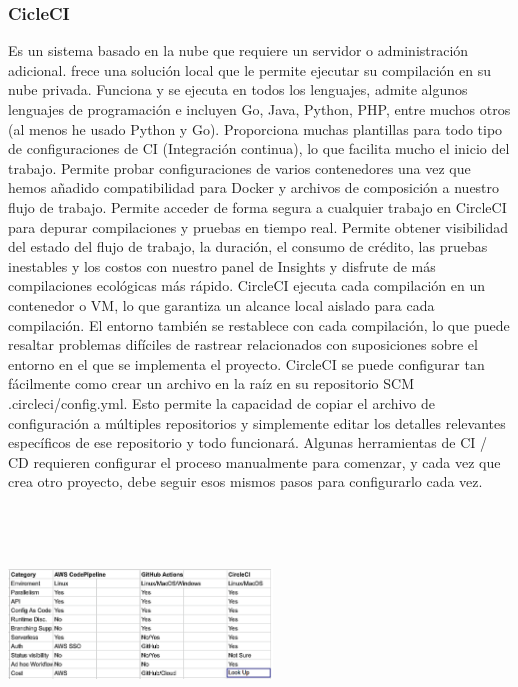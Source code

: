 \documentclass[twoside,twocolumn]{article}
\begin{document}
\subsubsection{CicleCI }
Es un sistema basado en la nube que requiere un servidor o administración adicional. frece una solución local que le permite ejecutar su compilación en su nube privada. Funciona y se ejecuta en todos los lenguajes, admite algunos lenguajes de programación e incluyen Go, Java, Python, PHP, entre muchos otros (al menos he usado Python y Go). Proporciona muchas plantillas para todo tipo de configuraciones de CI (Integración continua), lo que facilita mucho el inicio del trabajo. Permite probar configuraciones de varios contenedores una vez que hemos añadido compatibilidad para Docker y archivos de composición a nuestro flujo de trabajo. Permite acceder de forma segura a cualquier trabajo en CircleCI para depurar compilaciones y pruebas en tiempo real. Permite obtener visibilidad del estado del flujo de trabajo, la duración, el consumo de crédito, las pruebas inestables y los costos con nuestro panel de Insights y disfrute de más compilaciones ecológicas más rápido. CircleCI ejecuta cada compilación en un contenedor o VM, lo que garantiza un alcance local aislado para cada compilación. El entorno también se restablece con cada compilación, lo que puede resaltar problemas difíciles de rastrear relacionados con suposiciones sobre el entorno en el que se implementa el proyecto. CircleCI se puede configurar tan fácilmente como crear un archivo en la raíz en su repositorio SCM .circleci/config.yml. Esto permite la capacidad de copiar el archivo de configuración a múltiples repositorios y simplemente editar los detalles relevantes específicos de ese repositorio y todo funcionará. Algunas herramientas de CI / CD requieren configurar el proceso manualmente para comenzar, y cada vez que crea otro proyecto, debe seguir esos mismos pasos para configurarlo cada vez. 
\includegraphics[width=7cm, height=7cm]{imagenes/tabla_comparativa.png}
\end{document}
